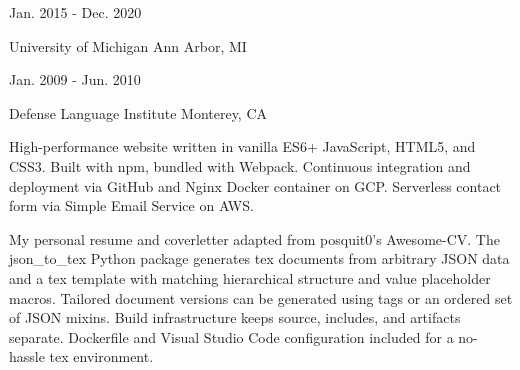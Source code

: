 \documentclass[11pt, a4paper]{cv}
\begin{document}
\begin{cv}
\begin{experience}
\end{experience}
\begin{education}
%
\begin{cventries}
\cventry
{Jan. 2015 - Dec. 2020}
{\begin{degrees}
%
%
\end{degrees}}
{University of Michigan}
{Ann Arbor, MI}
{\begin{cvitems}
%
\end{cvitems}}
\cventry
{Jan. 2009 - Jun. 2010}
{\begin{degrees}
%
\end{degrees}}
{Defense Language Institute}
{Monterey, CA}
{\begin{cvitems}
%
\end{cvitems}}
\end{cventries}
\end{education}
\begin{projects}
%
\begin{cventries}
\cventry
{}
{}
{}
{}
{\begin{cvparagraph}
High-performance website written in vanilla ES6+ JavaScript, HTML5, and CSS3. Built with npm, bundled with Webpack. Continuous integration and deployment via GitHub and Nginx Docker container on GCP. Serverless contact form via Simple Email Service on AWS.
\end{cvparagraph}}
\cventry
{}
{}
{}
{}
{\begin{cvparagraph}
My personal resume and coverletter adapted from posquit0's Awesome-CV. The json\_to\_tex Python package generates tex documents from arbitrary JSON data and a tex template with matching hierarchical structure and value placeholder macros. Tailored document versions can be generated using tags or an ordered set of JSON mixins. Build infrastructure keeps source, includes, and artifacts separate. Dockerfile and Visual Studio Code configuration included for a no-hassle tex environment.

\end{cvparagraph}}
\end{cventries}
\end{projects}
\end{cv}
\end{document}
